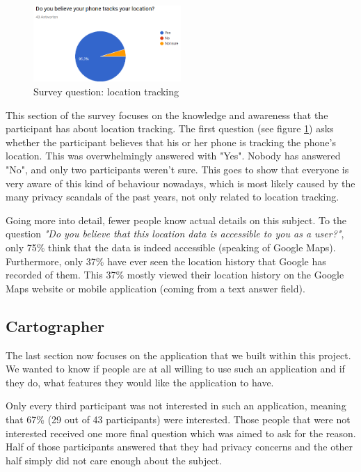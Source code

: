 \documentclass[12p]{article}
\begin{document}
	    \begin{figure}
          \begin{center}
            \includegraphics[width=0.5\textwidth]{survey/survey1}
          \end{center}
          \caption{Survey question: location tracking}
          \label{fig:survey_location_tracking}
        \end{figure}
	    
	    This section of the survey focuses on the knowledge and awareness that the participant has about location tracking. The first question (see figure \ref{fig:survey_location_tracking}) asks whether the participant believes that his or her phone is tracking the phone's location. This was overwhelmingly answered with "Yes". Nobody has answered "No", and only two participants weren't sure. This goes to show that everyone is very aware of this kind of behaviour nowadays, which is most likely caused by the many privacy scandals of the past years, not only related to location tracking.
        
        Going more into detail, fewer people know actual details on this subject. To the question \textit{"Do you believe that this location data is accessible to you as a user?"}, only 75\% think that the data is indeed accessible (speaking of Google Maps). Furthermore, only 37\% have ever seen the location history that Google has recorded of them. This 37\% mostly viewed their location history on the Google Maps website or mobile application (coming from a text answer field).
		
		\subsection{Cartographer}
		
		The last section now focuses on the application that we built within this project. We wanted to know if people are at all willing to use such an application and if they do, what features they would like the application to have.
		
		Only every third participant was not interested in such an application, meaning that 67\% (29 out of 43 participants) were interested. Those people that were not interested received one more final question which was aimed to ask for the reason. Half of those participants answered that they had privacy concerns and the other half simply did not care enough about the subject.
		
\end{document}
